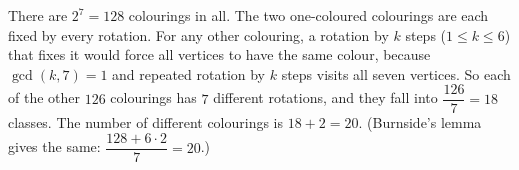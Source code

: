 There are $2^7=128$ colourings in all. The two one-coloured colourings are each fixed by every rotation. For any other colouring, a rotation by $k$ steps ($1\le k\le6$) that fixes it would force all vertices to have the same colour, because $\gcd(k,7)=1$ and repeated rotation by $k$ steps visits all seven vertices. So each of the other $126$ colourings has $7$ different rotations, and they fall into $\dfrac{126}{7}=18$ classes. The number of different colourings is $18+2=\boxed{20}$. (Burnside's lemma gives the same: $\dfrac{128+6\cdot2}{7}=20$.)
